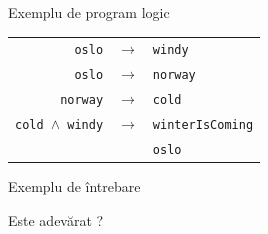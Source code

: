 \documentclass[xcolor=x11names,compress,10pt]{beamer}
\begin{document}
\begin{frame}{Exemplu de program logic}
\begin{center}
\begin{tabular}{rcl}
\texttt{oslo} & $\to$ & \texttt{windy} \\[.5em]
\texttt{oslo} & $\to$ & \texttt{norway} \\[.5em]
\texttt{norway} & $\to$ & \texttt{cold} \\[.5em]
\texttt{cold $\wedge$ windy} & $\to$ & \texttt{winterIsComing} \\[.5em]
& & \texttt{oslo}\\
\end{tabular}
\end{center}
\bigskip\pause

\begin{block}{Exemplu de întrebare}
\begin{center}
Este adevărat ?
\end{center}
\end{block}
\end{frame}




\end{document}
